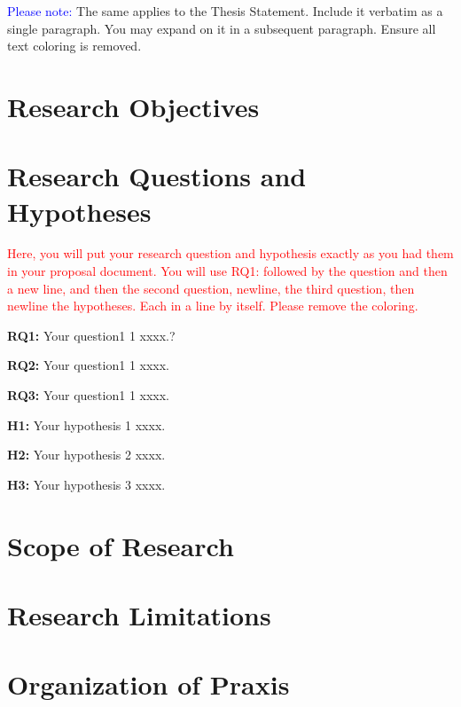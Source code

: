 \textcolor{blue}{Please note:} The same applies to the Thesis Statement. Include it verbatim as a single paragraph. You may expand on it in a subsequent paragraph. Ensure all text coloring is removed.
 
\lipsum[1]

\section{Research Objectives}
 
\lipsum[1]

\section{Research Questions and Hypotheses}


\lipsum[1] \par 

\textcolor{red}{Here, you will put your research question and hypothesis exactly as you had them in your proposal document. You will use RQ1: followed by the question and then a new line, and then the second question, newline, the third question, then newline the hypotheses. Each in a line by itself. Please remove the coloring.}


\textbf{RQ1:} Your question1 1 xxxx.?\par

\textbf{RQ2:} Your question1 1 xxxx.\par

\textbf{RQ3:} Your question1 1 xxxx.\par

\textbf{H1:} Your hypothesis 1 xxxx.\par

\textbf{H2:} Your hypothesis 2 xxxx. \par

\textbf{H3:} Your hypothesis 3 xxxx.\par

\section{Scope of Research}
 
\lipsum[1] \par 

\section{Research Limitations}
 
\lipsum[1] \par 

\section{ Organization of Praxis}

\lipsum[1] \par 
